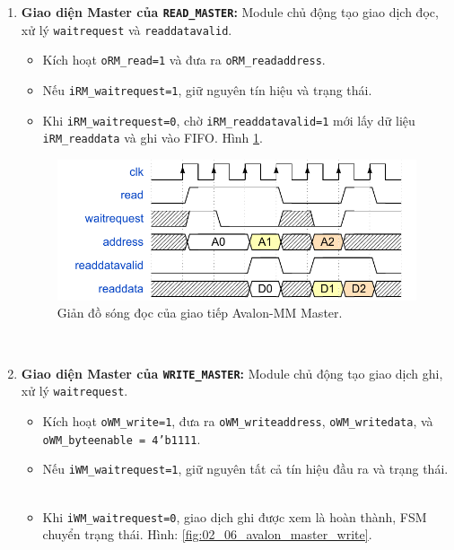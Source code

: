 \begin{enumerate}
    \item \textbf{Giao diện Master của \texttt{READ\_MASTER}:} Module chủ động tạo giao dịch đọc, xử lý \texttt{waitrequest} và \texttt{readdatavalid}.
        \begin{itemize}
            \item Kích hoạt \texttt{oRM\_read=1} và đưa ra \texttt{oRM\_readaddress}.
            \item Nếu \texttt{iRM\_waitrequest=1}, giữ nguyên tín hiệu và trạng thái.
            \item Khi \texttt{iRM\_waitrequest=0}, chờ \texttt{iRM\_readdatavalid=1} mới lấy dữ liệu \texttt{iRM\_readdata} và ghi vào FIFO. Hình \ref{fig:02_05_avalon_master_read}.
        \end{itemize}

    \begin{figure}[htbp]
        \centering
        \includegraphics[width=\linewidth]{Images/02_05_AvalonMaster_ReadWaveform.pdf}
        \caption{Giản đồ sóng đọc của giao tiếp Avalon-MM Master.}
        \label{fig:02_05_avalon_master_read}
    \end{figure}

    \item \textbf{Giao diện Master của \texttt{WRITE\_MASTER}:} Module chủ động tạo giao dịch ghi, xử lý \texttt{waitrequest}.
        \begin{itemize}
            \item Kích hoạt \texttt{oWM\_write=1}, đưa ra \texttt{oWM\_writeaddress}, \texttt{oWM\_writedata}, và \texttt{oWM\_byteenable = 4'b1111}.
            \item Nếu \texttt{iWM\_waitrequest=1}, giữ nguyên tất cả tín hiệu đầu ra và trạng thái.
            \item Khi \texttt{iWM\_waitrequest=0}, giao dịch ghi được xem là hoàn thành, FSM chuyển trạng thái. Hình: \ref{fig:02_06_avalon_master_write}.
        \end{itemize}


\end{enumerate}
